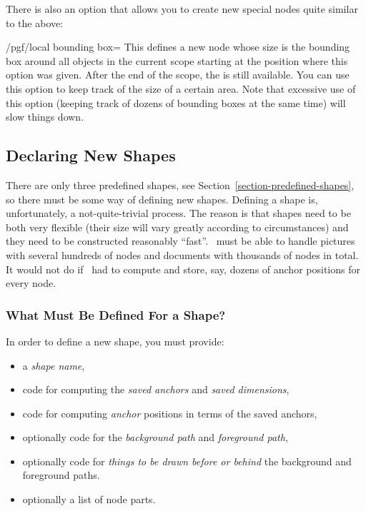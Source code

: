 There is also an option that allows you to create new special nodes quite
similar to the above:
%
\begin{key}{/pgf/local bounding box=}
    This defines a new node  whose size is the bounding box
    around all objects in the current scope starting at the position where this
    option was given. After the end of the scope, the  is still
    available. You can use this option to keep track of the size of a certain
    area. Note that excessive use of this option (keeping track of dozens of
    bounding boxes at the same time) will slow things down.
\begin{codeexample}[preamble={\usetikzlibrary{scopes}}]
\end{codeexample}
\end{key}


\subsection{Declaring New Shapes}

There are only three predefined shapes, see
Section~\ref{section-predefined-shapes}, so there must be some way of defining
new shapes. Defining a shape is, unfortunately, a not-quite-trivial process.
The reason is that shapes need to be both very flexible (their size will vary
greatly according to circumstances) and they need to be constructed reasonably
``fast''. \pgfname\ must be able to handle pictures with several hundreds of
nodes and documents with thousands of nodes in total. It would not do if
\pgfname\ had to compute and store, say, dozens of anchor positions for every
node.


\subsubsection{What Must Be Defined For a Shape?}

In order to define a new shape, you must provide:
%
\begin{itemize}
    \item a \emph{shape name},
    \item code for computing the  \emph{saved anchors} and \emph{saved
    dimensions},
    \item code for computing \emph{anchor} positions in terms of the saved
        anchors,
    \item optionally code for the \emph{background path} and \emph{foreground
        path},
    \item optionally code for \emph{things to be drawn before or behind} the
        background and foreground paths.
    \item optionally a list of node parts.
\end{itemize}


